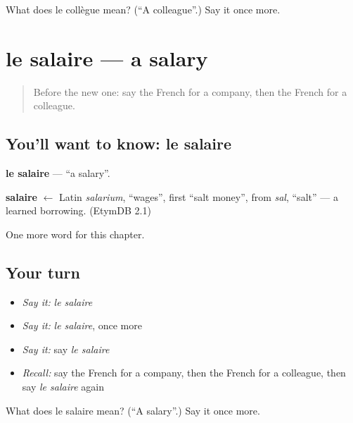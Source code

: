 \begin{tcolorbox}[breakable,colback=teal!4,colframe=teal!35!black,title={Before you move on}]
What does le collègue mean? (\textquotedblleft{}A colleague\textquotedblright{}.) Say it once more.
\end{tcolorbox}
\section[le salaire]{le salaire — a salary}

\label{lesson:FR-C174-salaire}



\begin{quote}
Before the new one: say the French for a company, then the French for a colleague.
\end{quote}

\subsection*{You'll want to know: le salaire}
\textbf{le salaire} — \textquotedblleft{}a salary\textquotedblright{}.

\begin{cousinweb}
\textbf{salaire} $\leftarrow$ Latin \emph{salarium}, \textquotedblleft{}wages\textquotedblright{}, first \textquotedblleft{}salt money\textquotedblright{}, from \emph{sal}, \textquotedblleft{}salt\textquotedblright{} — a learned borrowing. (EtymDB 2.1)
\end{cousinweb}

\begin{grammarlens}[title={What you've built}]
One more word for this chapter.
\end{grammarlens}

\subsection*{Your turn}
\begin{itemize}
\raggedright
  \item \emph{Say it:} \emph{le salaire}
  \item \emph{Say it:} \emph{le salaire}, once more
  \item \emph{Say it:} say \emph{le salaire}
  \item \emph{Recall:} say the French for a company, then the French for a colleague, then say \emph{le salaire} again
\end{itemize}

\begin{tcolorbox}[breakable,colback=teal!4,colframe=teal!35!black,title={Before you move on}]
What does le salaire mean? (\textquotedblleft{}A salary\textquotedblright{}.) Say it once more.
\end{tcolorbox}

